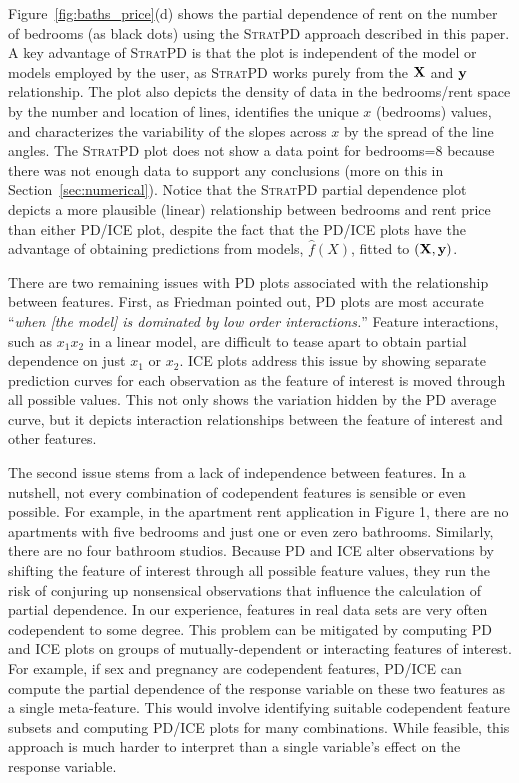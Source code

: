 \documentclass[12pt]{article}
\newcommand{\secref}[1]{Section~\ref{#1}}
\newcommand{\figref}[1]{Figure~\ref{#1}}
\newcommand{\spd}{\fontfamily{cmr}\textsc{\small StratPD}}
\begin{document}
\figref{fig:baths_price}(d) shows the partial dependence of rent on the number of bedrooms (as black dots) using the \spd{} approach described in this paper.  A key advantage of \spd{} is that the plot is independent of the model or models employed by the user, as \spd{} works purely from the $\bf X$ and $\bf y$ relationship. The plot also depicts the density of data in the bedrooms/rent space by the number and location of lines, identifies the unique $x$ (bedrooms) values, and characterizes the variability of the slopes across $x$ by the spread of the line angles. The \spd{} plot does not show a data point for bedrooms=8 because there was not enough data to support any conclusions (more on this in \secref{sec:numerical}). Notice that the \spd{} partial dependence  plot depicts a more plausible (linear) relationship between bedrooms and rent price than either PD/ICE plot, despite the fact that the PD/ICE plots have the advantage of obtaining predictions from models, $\widehat{f}(X)$, fitted to $({\bf X}, {\bf y})$.

There are two remaining issues with PD plots associated with the relationship between features. First, as Friedman pointed out, PD plots are most accurate ``{\em when {\em [the model]} is dominated by low order interactions.}''  Feature interactions, such as $x_1x_2$ in a linear model, are difficult to tease apart to obtain partial dependence on just $x_1$ or $x_2$.  ICE plots address this issue by showing separate prediction curves for each observation as the feature of interest is moved through all possible values.  This not only shows the variation hidden by the PD average curve, but it depicts interaction relationships between the feature of interest and other features. 

The second issue stems from a lack of independence between features.  In a nutshell, not every combination of codependent features is sensible or even possible. For example, in the apartment rent application in Figure 1, there are no apartments with five bedrooms and just one or even zero bathrooms. Similarly, there are no four bathroom studios. Because PD and ICE alter observations by shifting the feature of interest through all possible feature values, they run the risk of conjuring up nonsensical observations that influence the calculation of partial dependence. In our experience, features in real data sets are very often codependent to some degree. This problem can be mitigated by computing PD and ICE plots on groups of mutually-dependent or interacting features of interest. For example, if sex and pregnancy are codependent features, PD/ICE can compute the partial dependence of the response variable on these two features as a single meta-feature.  This would involve identifying suitable codependent feature subsets and computing PD/ICE plots for many combinations. While feasible, this approach is much harder to interpret than a single variable's effect on the response variable.
\end{document}
